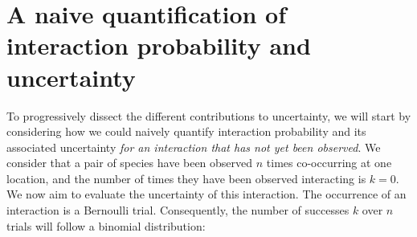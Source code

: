 \documentclass[12pt]{article}
\begin{document}


\section*{A naive quantification of interaction probability and uncertainty}



  To progressively dissect the different contributions to uncertainty, we will start by considering how we could naively quantify interaction probability and its associated uncertainty \emph{for an interaction that has not yet been observed}. We consider that a pair of species have been observed $n$ times co-occurring at one location, and the number of times they have been observed interacting is $k = 0$. We now aim to evaluate the uncertainty of this interaction. The occurrence of an interaction is a Bernoulli trial. Consequently, the number of successes $k$ over $n$ trials will follow a binomial distribution: 
      
\end{document}
